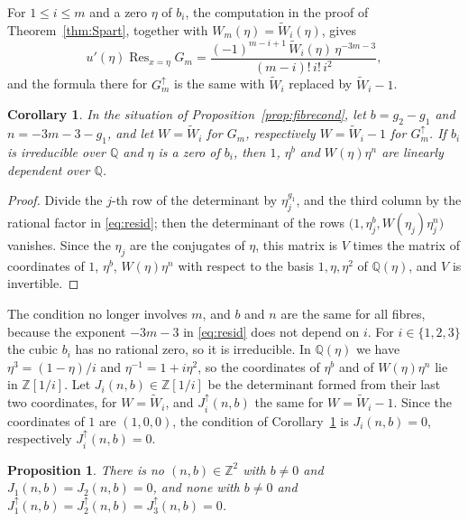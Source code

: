 \documentclass[11pt]{amsart}
\newtheorem{proposition}[theorem]{Proposition}
\newtheorem{corollary}[theorem]{Corollary}
\theoremstyle{definition}
\newcommand{\Q}{\mathbb{Q}}
\newcommand{\Z}{\mathbb{Z}}
\DeclareMathOperator{\Res}{Res}
\begin{document}
For $1\le i\le m$ and a zero $\eta$ of $b_i$, the computation in the proof of Theorem~\ref{thm:Spart}, together with $W_m(\eta)=\tilde W_i(\eta)$, gives
\begin{equation}\label{eq:resid}
  u'(\eta)\Res_{x=\eta}G_m=\frac{(-1)^{m-i+1}\,\tilde W_i(\eta)\,\eta^{-3m-3}}{(m-i)!\,i!\,i^2},
\end{equation}
and the formula there for $G^{\uparrow}_m$ is the same with $\tilde W_i$ replaced by $\tilde W_i-1$.

\begin{corollary}\label{cor:fibre}
In the situation of Proposition~\ref{prop:fibrecond}, let $b=g_2-g_1$ and $n=-3m-3-g_1$, and let $W=\tilde W_i$ for $G_m$, respectively $W=\tilde W_i-1$ for $G^{\uparrow}_m$. If $b_i$ is irreducible over $\Q$ and $\eta$ is a zero of $b_i$, then $1$, $\eta^b$ and $W(\eta)\eta^n$ are linearly dependent over $\Q$.
\end{corollary}

\begin{proof}
Divide the $j$-th row of the determinant by $\eta_j^{g_1}$, and the third column by the rational factor in \eqref{eq:resid}; then the determinant of the rows $\bigl(1,\eta_j^b,W(\eta_j)\eta_j^n\bigr)$ vanishes. Since the $\eta_j$ are the conjugates of $\eta$, this matrix is $V$ times the matrix of coordinates of $1$, $\eta^b$, $W(\eta)\eta^n$ with respect to the basis $1,\eta,\eta^2$ of $\Q(\eta)$, and $V$ is invertible.
\end{proof}

The condition no longer involves $m$, and $b$ and $n$ are the same for all fibres, because the exponent $-3m-3$ in \eqref{eq:resid} does not depend on $i$. For $i\in\{1,2,3\}$ the cubic $b_i$ has no rational zero, so it is irreducible. In $\Q(\eta)$ we have $\eta^3=(1-\eta)/i$ and $\eta^{-1}=1+i\eta^2$, so the coordinates of $\eta^b$ and of $W(\eta)\eta^n$ lie in $\Z[1/i]$. Let $J_i(n,b)\in\Z[1/i]$ be the determinant formed from their last two coordinates, for $W=\tilde W_i$, and $J^{\uparrow}_i(n,b)$ the same for $W=\tilde W_i-1$. Since the coordinates of $1$ are $(1,0,0)$, the condition of Corollary~\ref{cor:fibre} is $J_i(n,b)=0$, respectively $J^{\uparrow}_i(n,b)=0$.

\begin{proposition}\label{prop:dioph}
There is no $(n,b)\in\Z^2$ with $b\ne0$ and $J_1(n,b)=J_2(n,b)=0$, and none with $b\ne0$ and $J^{\uparrow}_1(n,b)=J^{\uparrow}_2(n,b)=J^{\uparrow}_3(n,b)=0$.
\end{proposition}
\end{document}
